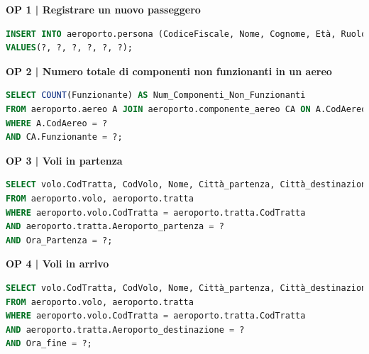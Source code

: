 
\textbf{\small OP 1 | Registrare un nuovo passeggero}

	
\begin{lstlisting}[language=SQL]
INSERT INTO aeroporto.persona (CodiceFiscale, Nome, Cognome, Età, Ruolo,  CodVolo )
VALUES(?, ?, ?, ?, ?, ?); 
\end{lstlisting} 


\textbf{\small OP 2 | Numero totale di componenti non funzionanti in un aereo}\\

\begin{lstlisting}[language=SQL]
SELECT COUNT(Funzionante) AS Num_Componenti_Non_Funzionanti
FROM aeroporto.aereo A JOIN aeroporto.componente_aereo CA ON A.CodAereo = CA.CodAereo
WHERE A.CodAereo = ?
AND CA.Funzionante = ?;
\end{lstlisting}


\textbf{\small OP 3 | Voli in partenza}\\

\begin{lstlisting}[language=SQL]
SELECT volo.CodTratta, CodVolo, Nome, Città_partenza, Città_destinazione, Aeroporto_partenza, Aeroporto_destinazione, Ora_partenza, Ora_fine
FROM aeroporto.volo, aeroporto.tratta 
WHERE aeroporto.volo.CodTratta = aeroporto.tratta.CodTratta
AND aeroporto.tratta.Aeroporto_partenza = ?
AND Ora_Partenza = ?;
\end{lstlisting}


\textbf{\small OP 4 | Voli in arrivo}\\

\begin{lstlisting}[language=SQL]
SELECT volo.CodTratta, CodVolo, Nome, Città_partenza, Città_destinazione, Aeroporto_partenza, Aeroporto_destinazione, Ora_partenza, Ora_fine
FROM aeroporto.volo, aeroporto.tratta
WHERE aeroporto.volo.CodTratta = aeroporto.tratta.CodTratta
AND aeroporto.tratta.Aeroporto_destinazione = ?
AND Ora_fine = ?;	
\end{lstlisting}


